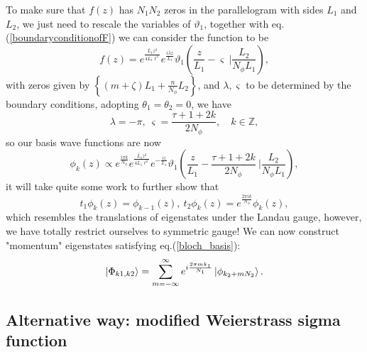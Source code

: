 \documentclass[%
nofootinbib,
 amsmath,amssymb,
 aps,onecolumn,
prb
]{revtex4-2}
\begin{document}
To make sure that $f(z)$ has $N_1N_2$ zeros in the parallelogram with sides $L_1$ and $L_2$, we just need to rescale the variables of $\vartheta_1$, together with eq.(\ref*{boundaryconditionofF}) we 
can consider the function to be 
\begin{equation}
    f(z)=e^{\frac{\bar{L}_1z^2}{4L_1\ell^2}}e^{\frac{i\lambda z}{L_1}}\vartheta_1\left(\frac{z}{L_1}-\varsigma \ \bigg\vert\frac{L_2}{N_\phi L_1}\right),
\end{equation}
with zeros given by $\left\{(m+\zeta)L_1+\frac{n}{N_\phi}L_2\right\}$, and $\lambda,\varsigma $ to be determined by the boundary conditions, adopting $\theta_1=\theta_2=0$, we have 
\begin{equation}
    \lambda=-\pi,\ \varsigma=\frac{\tau+1+2k}{2N_\phi},\quad k\in\mathbb{Z},
\end{equation}
so our basis wave functions are now 
\begin{equation}
    \phi_k(z)\propto e^{\frac{i\pi k}{N_\phi}}e^{\frac{\bar{L}_1z^2}{4L_1\ell^2}}e^{-\frac{i z}{L_1}}\vartheta_1\left(\frac{z}{L_1}-\frac{\tau+1+2k}{2N_\phi} \ \bigg\vert\frac{L_2}{N_\phi L_1}\right),
\end{equation}
it will take quite some work to further show that 
\begin{equation}
    t_1\phi_k(z)=\phi_{k-1}(z),\ t_2\phi_k(z)=e^{\frac{2\pi ik}{N_\phi}}\phi_k(z),
\end{equation}
which resembles the translations of eigenstates under the Landau gauge, however, we have totally restrict ourselves to symmetric gauge! We can now construct "momentum" eigenstates satisfying eq.(\ref{bloch_basis}):
\begin{equation}
    \ket{\Phi_{k1,k2}}=\sum_{m=-\infty}^{\infty}e^{i\frac{2\pi mk_1}{N_1}}\ket{\phi_{k_2+mN_2}}.
\end{equation}  
\subsection{Alternative way: modified Weierstrass sigma function}
\end{document}
